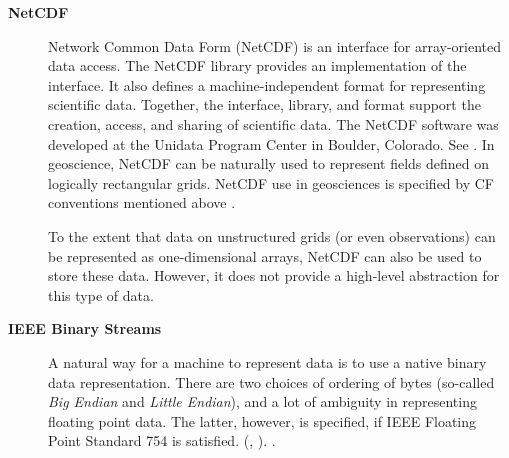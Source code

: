 \begin{description}
\item[\bf NetCDF] Network Common Data Form (NetCDF) is an interface for 
array-oriented data access. The NetCDF library provides an
implementation of the interface. It also defines a 
machine-independent format for representing scientific data. Together,
the interface, library, and format support the creation, access, and
sharing of scientific data. The NetCDF software was developed at the
Unidata Program Center in Boulder, Colorado. See \cite{NetCDF3_UsersGuide_C}.
In geoscience, NetCDF can be naturally used to represent fields
defined on logically rectangular grids. NetCDF use in geosciences is 
specified by CF conventions mentioned above \cite{NetCDF_CF}.

To the extent that data on unstructured grids (or even observations) can be 
represented as one-dimensional arrays, NetCDF can also be used to store these 
data. However, it does not provide a high-level abstraction for this type of 
data. 

\item[\bf IEEE Binary Streams]
A natural way for a machine to represent data is to use a native
binary data representation. There are two choices of ordering of bytes
(so-called {\it Big Endian} and {\it Little Endian}), and a lot of
ambiguity in representing floating point data. The latter, however, is
specified, if IEEE Floating Point Standard 754 is satisfied.
(\cite{IEEE-Floating-Point}, \cite{Kahan-IEEE-754}). 
\cite{XML-W3C}.

\end{description}

